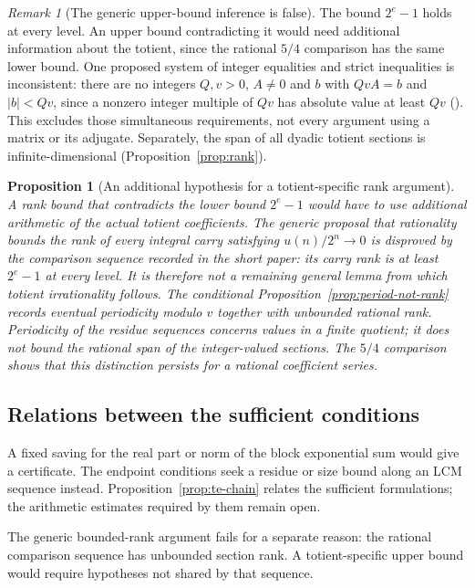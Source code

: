 \documentclass[11pt]{article}
\theoremstyle{plain}
\newtheorem{prop}[thm]{Proposition}
\theoremstyle{definition}
\theoremstyle{remark}
\newtheorem{rem}[thm]{Remark}
\newcommand{\lean}[2]{\leanlink{#2}}
\begin{document}
\begin{rem}[The generic upper-bound inference is false]
The bound $2^e-1$ holds at every level. An upper bound contradicting it
would need additional information about the totient, since the rational
$5/4$ comparison has the same lower bound. One proposed system of integer
equalities and strict inequalities is inconsistent: there are no integers
$Q,v>0$, $A\ne0$ and $b$ with $QvA=b$ and $|b|<Qv$, since a nonzero
integer multiple of $Qv$ has absolute value at least $Qv$
(\lean{false_of_compressedAdjointCertificate}{TotientMahlerDefect.lean:1183}).
This excludes those simultaneous
requirements, not every argument using a matrix or its adjugate.
Separately, the span of all dyadic totient sections is
infinite-dimensional (Proposition~\ref{prop:rank}).
\end{rem}

\begin{prop}[An additional hypothesis for a totient-specific rank argument]\label{prop:additional-hypothesis-totient-specific-rank}
A rank bound that contradicts the lower bound $2^e-1$ would have to use
additional arithmetic of the actual totient coefficients. The generic
proposal that rationality bounds the rank of every integral carry
satisfying $u(n)/2^n\to0$ is disproved by the comparison sequence
recorded in the short paper:
its carry rank is at least $2^e-1$ at every level. It is therefore not a
remaining general lemma from which totient irrationality follows.
The conditional Proposition~\ref{prop:period-not-rank}
records eventual periodicity modulo $v$ together with unbounded rational
rank. Periodicity of the residue sequences concerns values in a finite
quotient; it does not bound the rational span of the integer-valued
sections. The $5/4$ comparison shows that this distinction persists for
a rational coefficient series.
\end{prop}

\subsection{Relations between the sufficient conditions}

A fixed saving for the real part or norm of the block exponential
sum would give a certificate. The endpoint conditions seek a residue
or size bound along an LCM sequence instead.
Proposition~\ref{prop:te-chain} relates the sufficient formulations;
the arithmetic estimates required by them remain open.

The generic bounded-rank argument fails for a separate reason: the rational
comparison sequence has unbounded section rank. A totient-specific upper
bound would require hypotheses not shared by that sequence.
\end{document}
